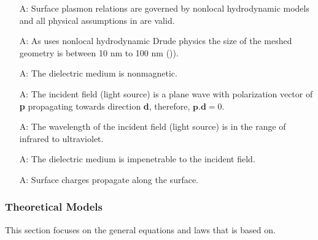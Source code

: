 \documentclass[12pt]{article}
\newcounter{assumpnum} %
\begin{document}
	
	\begin{itemize}
		
		\item[A\refstepcounter{assumpnum}\theassumpnum \label{A_nonlocal}:] Surface
		plasmon relations are governed by nonlocal hydrodynamic models and all
		physical assumptions in \cite{hiremath2012numerical} are valid.
		
		\item[A\refstepcounter{assumpnum}\theassumpnum \label{A_size}:] As \progname{}
		uses nonlocal hydrodynamic Drude physics the size of the meshed geometry is
		between 10 nm to 100 nm (\cite{hiremath2012numerical})).
		
		\item[A\refstepcounter{assumpnum}\theassumpnum \label{A_nonmag}:] The
		dielectric medium is nonmagnetic.
		
		\item[A\refstepcounter{assumpnum}\theassumpnum \label{A_pd}:] The incident
		field (light source) is a plane wave with polarization vector of \textbf{p}
		propagating towards direction \textbf{d}, therefore, $\textbf{p}.\textbf{d} =
		0$.
		
		\item[A\refstepcounter{assumpnum}\theassumpnum \label{A_wl}:] The wavelength
		of the incident field (light source) is in the range of infrared to
		ultraviolet.
		
		\item[A\refstepcounter{assumpnum}\theassumpnum \label{A_impenetrable}:] The
		dielectric medium is impenetrable to the incident field.
		
		\item[A\refstepcounter{assumpnum}\theassumpnum \label{A_leakage}:] Surface
		charges propagate along the surface.
		
		
		
	\end{itemize}
	
	\subsubsection{Theoretical Models}\label{sec_theoretical}
	
	This section focuses on the general equations and laws that \progname{} is
	based on. %
	
\end{document}

